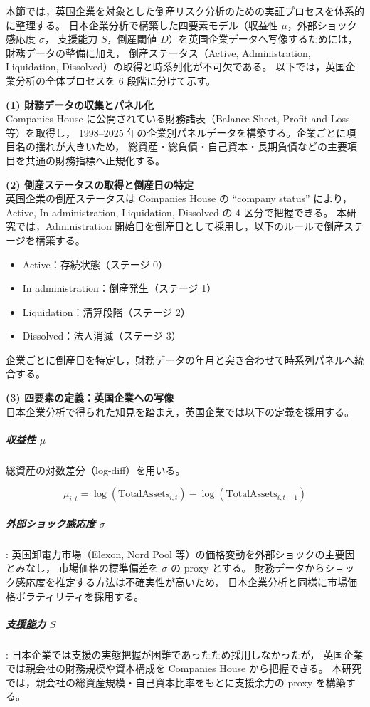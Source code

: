 本節では，英国企業を対象とした倒産リスク分析のための実証プロセスを体系的に整理する。
日本企業分析で構築した四要素モデル（収益性 $\mu$，外部ショック感応度 $\sigma$，
支援能力 $S$，倒産閾値 $D$）を英国企業データへ写像するためには，財務データの整備に加え，
倒産ステータス（Active, Administration, Liquidation, Dissolved）の取得と時系列化が不可欠である。
以下では，英国企業分析の全体プロセスを 6 段階に分けて示す。

\textbf{(1) 財務データの収集とパネル化}\\
Companies House に公開されている財務諸表（Balance Sheet, Profit and Loss 等）を取得し，
1998--2025 年の企業別パネルデータを構築する。企業ごとに項目名の揺れが大きいため，
総資産・総負債・自己資本・長期負債などの主要項目を共通の財務指標へ正規化する。

\textbf{(2) 倒産ステータスの取得と倒産日の特定}\\
英国企業の倒産ステータスは Companies House の ``company status'' により，
Active, In administration, Liquidation, Dissolved の 4 区分で把握できる。
本研究では，Administration 開始日を倒産日として採用し，以下のルールで倒産ステージを構築する。
\begin{itemize}
    \item Active：存続状態（ステージ 0）
    \item In administration：倒産発生（ステージ 1）
    \item Liquidation：清算段階（ステージ 2）
    \item Dissolved：法人消滅（ステージ 3）
\end{itemize}
企業ごとに倒産日を特定し，財務データの年月と突き合わせて時系列パネルへ統合する。

\textbf{(3) 四要素の定義：英国企業への写像}\\
日本企業分析で得られた知見を踏まえ，英国企業では以下の定義を採用する。

\subparagraph{収益性 $\mu$}
総資産の対数差分（log-diff）を用いる。


\[
\mu_{i,t} = \log(\text{TotalAssets}_{i,t}) - \log(\text{TotalAssets}_{i,t-1})
\]



\subparagraph{外部ショック感応度 $\sigma$}:
英国卸電力市場（Elexon, Nord Pool 等）の価格変動を外部ショックの主要因とみなし，
市場価格の標準偏差を $\sigma$ の proxy とする。
財務データからショック感応度を推定する方法は不確実性が高いため，
日本企業分析と同様に市場価格ボラティリティを採用する。

\subparagraph{支援能力 $S$}:
日本企業では支援の実態把握が困難であったため採用しなかったが，
英国企業では親会社の財務規模や資本構成を Companies House から把握できる。
本研究では，親会社の総資産規模・自己資本比率をもとに支援余力の proxy を構築する。

